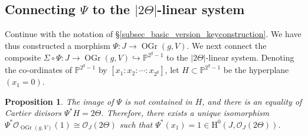 \documentclass{article} %
\newtheorem{proposition}{Proposition}[section]
\numberwithin{equation}{section}
\renewcommand{\P}{\mathbb{P}}
\renewcommand{\O}{\mathcal{O}}
\newcommand{\HH}{\mathrm{H}}
\DeclareMathOperator{\OGr}{OGr}
\begin{document}
\subsection{Connecting $\Psi$ to the $|2\Theta|$-linear system}

Continue with the notation of \S\ref{subsec_basic_version_keyconstruction}. 
We have thus constructed a morphism $\Psi : J \to \OGr(g, V)$. We next connect the composite  $\Sigma \circ \Psi\colon J\rightarrow \OGr(g,V)\hookrightarrow \P^{2^g-1}$ to the $|2\Theta|$-linear system.
Denoting the co-ordinates of $\P^{2^g-1}$ by $[x_1 : x_2 : \cdots : x_{2^g}]$, let $H\subset \P^{2^g-1}$ be the hyperplane $(x_1 = 0)$.

\begin{proposition}\label{prop_firstpropertieskummerembedding}
The image of $\Psi$ is not contained in $H$, and there is an equality of Cartier divisors $\Psi^{*}H =2\Theta$. 
    Therefore, there exists a unique isomorphism $\Psi^*\O_{\OGr(g, V)}(1) \cong \O_J(2\Theta)$ such that $\Psi^*(x_1) = 1 \in \HH^0(J, \O_J(2\Theta))$.
\end{proposition}
\end{document}
